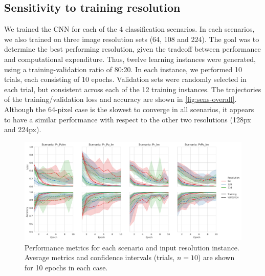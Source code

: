 \documentclass[Journal,letterpaper, SingleSpace, InsideFigs]{ascelike-new}
\begin{document}
\subsection{Sensitivity to training resolution}
We trained the CNN for each of the 4 classification scenarios. In each scenarios, we also trained on three image resolution sets (64, 108 and 224). The goal was to determine the best performing resolution, given the tradeoff between performance and computational expenditure. Thus, twelve learning instances were generated, using a training-validation ratio of 80:20. In each instance, we performed 10 trials, each consisting of 10 epochs. Validation sets were randomly selected in each trial, but consistent across each of the 12 training instances. The trajectories of the training/validation loss and accuracy are shown in \autoref{fig:sens-overall}. Although the 64-pixel case is the slowest to converge in all scenarios, it appears to have a similar performance with respect to the other two resolutions (128px and 224px).

\begin{figure}[ht]
    \centering
    \includegraphics[width=1.05\textwidth]{scenario_resolution_performance.png}
    \caption{Performance metrics for each scenario and input resolution instance. Average metrics and confidence intervals (trials, $n=10$) are shown for 10 epochs in each case.}
    \label{fig:sens-overall}
\end{figure}
\end{document}

